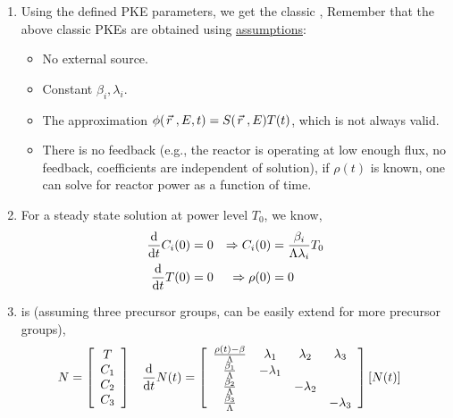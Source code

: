 \documentclass{school-22.211-notes}
\begin{document}
\begin{enumerate}
\item Using the defined PKE parameters, we get the classic ,
Remember that the above classic PKEs are obtained using \uline{assumptions}: 
\begin{itemize}
\item No external source.
\item Constant $\beta_i, \lambda_i$. 
\item The approximation $\phi(\left.\vec{r}\right., E, t) = S(\left.\vec{r}\right., E) T(t)$, which is not always valid. 
\item There is no feedback (e.g., the reactor is operating at low enough flux, no feedback, coefficients are independent of solution), if $\rho(t)$ is known, one can solve for reactor power as a function of time.
\end{itemize}

\item For a steady state solution at power level $T_0$, we know, 
  \begin{align}
    \frac{\mathrm{d}}{\mathrm{d}t} C_i (0) &= 0  &\Rightarrow  C_i (0) &= \frac{\beta_i}{\Lambda \lambda_i} T_0  \notag \\
    \frac{\mathrm{d}}{\mathrm{d}t} T(0) &= 0  &\Rightarrow \rho(0) &= 0  \label{in-hour}
  \end{align}

\item {} is (assuming three precursor groups, can be easily extend for more precursor groups),  
\begin{align}
N &= \left[ \begin{array}{c} T \\ C_1 \\ C_2 \\ C_3 \end{array} \right]  
& \frac{\mathrm{d}}{\mathrm{d}t} N(t) &= \left[ \begin{array}{cccc} 
\frac{\rho(t) - \beta}{\Lambda} & \lambda_1 & \lambda_2 & \lambda_3 \\
\frac{\beta_1}{\Lambda} & - \lambda_1 & & \\
\frac{\beta_2}{\Lambda} & & -\lambda_2 & \\
\frac{\beta_3}{\Lambda} & & & -\lambda_3 \end{array} \right] 
\left[ N(t) \right] 
\end{align}
\end{enumerate}
\end{document}
